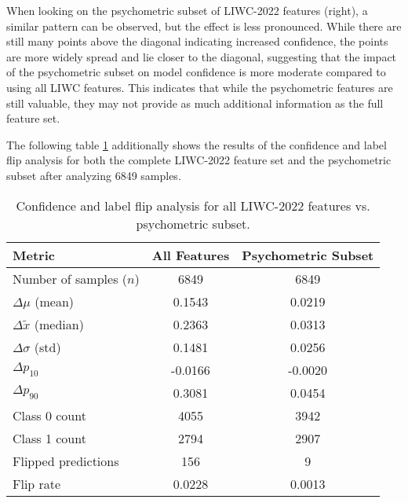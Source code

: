 When looking on the psychometric subset of LIWC-2022 features (right), a similar pattern can be observed, but the effect is less pronounced. While there are still many points above the diagonal indicating increased confidence, the points are more widely spread and lie closer to the diagonal, suggesting that the impact of the psychometric subset on model confidence is more moderate compared to using all LIWC features. This indicates that while the psychometric features are still valuable, they may not provide as much additional information as the full feature set.

The following table \ref{tab:confidence_label_flip} additionally shows the results of the confidence and label flip analysis for both the complete LIWC-2022 feature set and the psychometric subset after analyzing 6849 samples.

\begin{table}[H]
\centering
\caption{Confidence and label flip analysis for all LIWC-2022 features vs. psychometric subset.}
\begin{tabular}{lcc}
\toprule
\textbf{Metric} & \textbf{All Features} & \textbf{Psychometric Subset} \\
\midrule
Number of samples ($n$)            & 6849    & 6849 \\
$\Delta \mu$ (mean)                & 0.1543  & 0.0219 \\
$\Delta \tilde{x}$ (median)        & 0.2363  & 0.0313 \\
$\Delta \sigma$ (std)              & 0.1481  & 0.0256 \\
$\Delta p_{10}$                    & -0.0166 & -0.0020 \\
$\Delta p_{90}$                    & 0.3081  & 0.0454 \\
Class 0 count                      & 4055    & 3942 \\
Class 1 count                      & 2794    & 2907 \\
Flipped predictions                & 156     & 9 \\
Flip rate                          & 0.0228  & 0.0013 \\
\bottomrule
\end{tabular}
\label{tab:confidence_label_flip}
\end{table}

